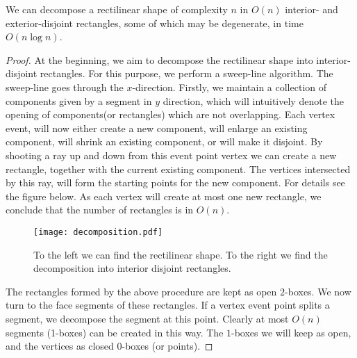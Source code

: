   \begin{lemma}
	  We can decompose a rectilinear shape of complexity $n$ in $O(n)$ interior- and exterior-disjoint rectangles, some of which may be degenerate, in time $O(n \log n)$.
  \label{lem:2d}
  \end{lemma}
  \begin{proof}
  At the beginning, we aim to decompose the rectilinear shape into interior-disjoint rectangles.
  For this purpose, we perform a sweep-line algorithm. The sweep-line goes through the $x$-direction. 
  Firstly, we maintain a collection of components given by a segment in $y$ direction, which will intuitively denote the opening of components(or rectangles) which are not overlapping.
  Each vertex event, will now either create a new component, will enlarge an existing component, will shrink an existing component, or will make it disjoint. By shooting a ray up and down from this event point vertex
  we can create a new rectangle, together with the current existing component. The vertices intersected by this ray, will form the starting points for the new component.
  For details see the figure below. As each vertex will create at most one new rectangle, we conclude that the number of rectangles is in $O(n)$.
  \begin{figure}[H]
  \texttt{[image: decomposition.pdf]}
  \caption{To the left we can find the rectilinear shape. To the right we find the decomposition into interior disjoint rectangles.}
  \end{figure}
  The rectangles formed by the above procedure are kept as open $2$-boxes.
  We now turn to the face segments of these rectangles. If a vertex event point splits a segment, we 
  decompose the segment at this point. Clearly at most $O(n)$ segments (1-boxes) can be created in this way.
  The $1$-boxes we will keep as open, and the vertices as closed $0$-boxes (or points).
\end{proof}



